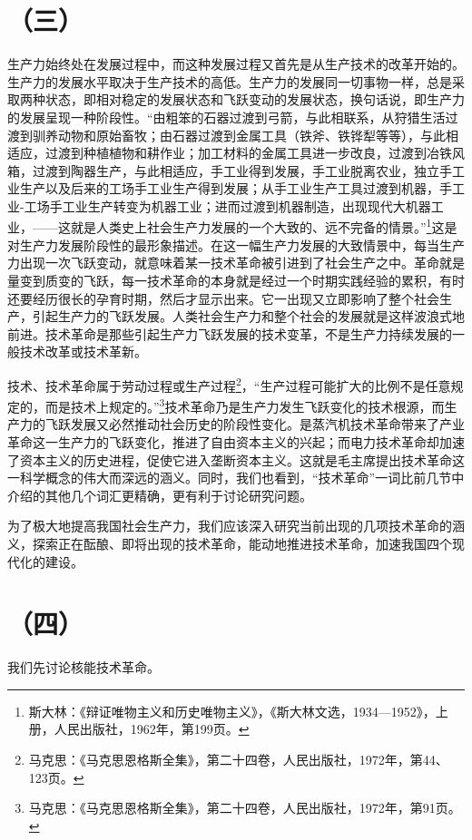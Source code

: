 \section*{（三）}
生产力始终处在发展过程中，而这种发展过程又首先是从生产技术的改革开始的。生产力的发展水平取决于生产技术的高低。生产力的发展同一切事物一样，总是采取两种状态，即相对稳定的发展状态和飞跃变动的发展状态，换句话说，即生产力的发展呈现一种阶段性。“由粗笨的石器过渡到弓箭，与此相联系，从狩猎生活过渡到驯养动物和原始畜牧；由石器过渡到金属工具（铁斧、铁铧犁等等），与此相适应，过渡到种植植物和耕作业；加工材料的金属工具进一步改良，过渡到冶铁风箱，过渡到陶器生产，与此相适应，手工业得到发展，手工业脱离农业，独立手工业生产以及后来的工场手工业生产得到发展；从手工业生产工具过渡到机器，手工业-工场手工业生产转变为机器工业；进而过渡到机器制造，出现现代大机器工业，——这就是人类史上社会生产力发展的一个大致的、远不完备的情景。”\footnote{斯大林：《辩证唯物主义和历史唯物主义》，《斯大林文选，1934—1952》，上册，人民出版社，1962年，第199页。}这是对生产力发展阶段性的最形象描述。在这一幅生产力发展的大致情景中，每当生产力出现一次飞跃变动，就意味着某一技术革命被引进到了社会生产之中。革命就是量变到质变的飞跃，每一技术革命的本身就是经过一个时期实践经验的累积，有时还要经历很长的孕育时期，然后才显示出来。它一出现又立即影响了整个社会生产，引起生产力的飞跃发展。人类社会生产力和整个社会的发展就是这样波浪式地前进。技术革命是那些引起生产力飞跃发展的技术变革，不是生产力持续发展的一般技术改革或技术革新。

技术、技术革命属于劳动过程或生产过程\footnote{马克思：《马克思恩格斯全集》，第二十四卷，人民出版社，1972年，第44、123页。}，“生产过程可能扩大的比例不是任意规定的，而是技术上规定的。”\footnote{马克思：《马克思恩格斯全集》，第二十四卷，人民出版社，1972年，第91页。}技术革命乃是生产力发生飞跃变化的技术根源，而生产力的飞跃发展又必然推动社会历史的阶段性变化。是蒸汽机技术革命带来了产业革命这一生产力的飞跃变化，推进了自由资本主义的兴起；而电力技术革命却加速了资本主义的历史进程，促使它进入垄断资本主义。这就是毛主席提出技术革命这一科学概念的伟大而深远的涵义。同时，我们也看到，“技术革命”一词比前几节中介绍的其他几个词汇更精确，更有利于讨论研究问题。

为了极大地提高我国社会生产力，我们应该深入研究当前出现的几项技术革命的涵义，探索正在酝酿、即将出现的技术革命，能动地推进技术革命，加速我国四个现代化的建设。

\section*{（四）}
我们先讨论核能技术革命。


